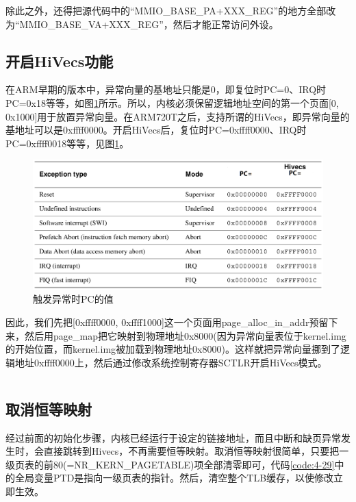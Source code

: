 \documentclass[main.tex]{subfiles}
\begin{document}
\begin{CJK*}{UTF8}{song}
\begin{code}
\label{code:4-27}
\inputminted[firstline=371,lastline=376,linenos,numbersep=5pt,frame=lines,framesep=2mm]{c}{src/chapter04/kernel/machdep.c}
\end{code}

除此之外，还得把源代码中的“MMIO\_BASE\_PA+XXX\_REG”的地方全部改为“MMIO\_BASE\_VA+XXX\_REG”，然后才能正常访问外设。

\subsection{开启HiVecs功能}
在ARM早期的版本中，异常向量的基地址只能是0，即复位时PC=0、IRQ时PC=0x18等等，如图\ref{figure:4-8}所示。所以，内核必须保留逻辑地址空间的第一个页面[0, 0x1000]用于放置异常向量。在ARM720T之后，支持所谓的HiVecs，即异常向量的基地址可以是0xffff0000。开启HiVecs后，复位时PC=0xffff0000、IRQ时PC=0xffff0018等等，见图\ref{figure:4-8}。

\begin{figure}[htp]
\centering
\includegraphics[scale=0.3]{figures/4-8}
\caption{触发异常时PC的值}
\label{figure:4-8}
\end{figure}

因此，我们先把[0xffff0000, 0xffff1000]这一个页面用page\_alloc\_in\_addr预留下来，然后用page\_map把它映射到物理地址0x8000(因为异常向量表位于kernel.img的开始位置，而kernel.img被加载到物理地址0x8000)。这样就把异常向量挪到了逻辑地址0xffff0000上，然后通过修改系统控制寄存器SCTLR开启HiVecs模式。

\begin{code}
\label{code:4-28}
\inputminted[firstline=378,lastline=396,linenos,numbersep=5pt,frame=lines,framesep=2mm]{c}{src/chapter04/kernel/machdep.c}
\end{code}

\subsection{取消恒等映射}
经过前面的初始化步骤，内核已经运行于设定的链接地址，而且中断和缺页异常发生时，会直接跳转到Hivecs，不再需要恒等映射。取消恒等映射很简单，只要把一级页表的前80(=NR\_KERN\_PAGETABLE)项全部清零即可，代码\ref{code:4-29}中的全局变量PTD是指向一级页表的指针。然后，清空整个TLB缓存，以使修改立即生效。


\end{CJK*}
\end{document}
